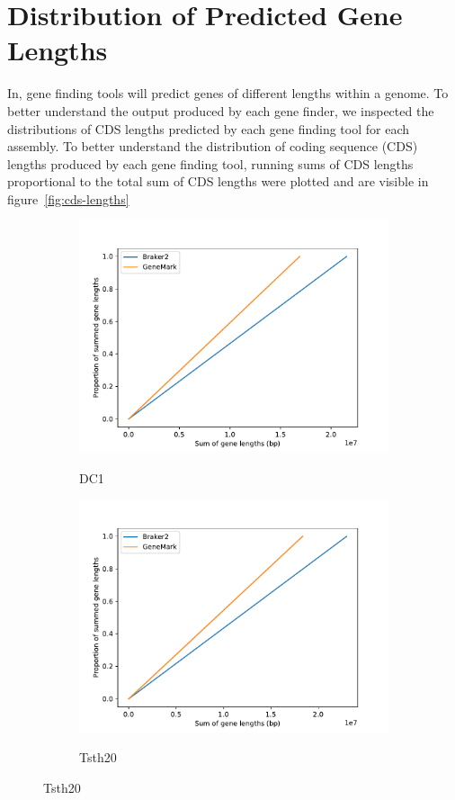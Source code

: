 \section{Distribution of Predicted Gene Lengths}

In, gene finding tools will predict genes of different lengths within
a genome. To better understand the output produced by each gene
finder, we inspected the distributions of CDS lengths predicted by
each gene finding tool for each assembly. To better understand the
distribution of coding sequence (CDS) lengths produced by each gene
finding tool, running sums of CDS lengths proportional to the total
sum of CDS lengths were plotted and are visible in
figure~\ref{fig:cds-lengths}

\begin{figure}
  \centering
    \begin{subfigure}{0.8\textwidth}
      \includegraphics[width=\textwidth]{figures/dc1-cumulative-gene-lengths.pdf}
      \label{fig:dc1-lengths}
      \caption{DC1}
    \end{subfigure}
    \begin{subfigure}{0.8\textwidth}
      \includegraphics[width=\textwidth]{figures/tsth20-cumulative-gene-lengths.pdf}
      \label{fig:tsth20-lengths}
      \caption{Tsth20}
    \end{subfigure}
\end{figure}
